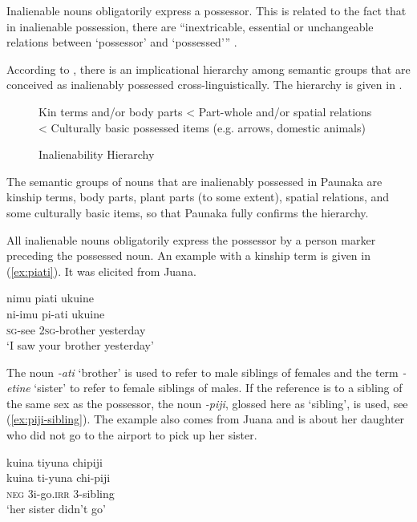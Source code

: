 Inalienable nouns obligatorily express a possessor. This is related to the fact that in inalienable possession, there are “inextricable, essential or unchangeable relations between ‘possessor’ and ‘possessed’” \citep[4]{ChappelMcGregor1996}. 

According to \citet[572]{Nichols1988}, there is an implicational hierarchy among semantic groups that are conceived as inalienably possessed cross-linguistically. The hierarchy is given in .

\begin{figure}[!ht]
\centering
Kin terms and/or body parts < Part-whole and/or spatial relations < Culturally basic possessed items (e.g. arrows, domestic animals)
\caption{Inalienability Hierarchy \citep[572]{Nichols1988}}
\label{fig:InalienabilityHierarchy}
\end{figure}

The semantic groups of nouns that are inalienably possessed in Paunaka are kinship terms, body parts, plant parts (to some extent), spatial relations, and some culturally basic items, so that Paunaka fully confirms the hierarchy.

All inalienable nouns obligatorily express the possessor by a person marker preceding the possessed noun. An example with a kinship term is given in (\ref{ex:piati}). It was elicited from Juana.

\ea\label{ex:piati}
\begingl 
\glpreamble nimu piati ukuine\\
\gla ni-imu pi-ati ukuine\\ 
\textsc{sg}-see 2\textsc{sg}-brother yesterday\\ 
\glft ‘I saw your brother yesterday’
\trailingcitation{[jxx-e110923l-1.049]}
\xe
{}

The noun \textit{-ati} ‘brother’ is used to refer to male siblings of females and the term \textit{-etine} ‘sister’ to refer to female siblings of males. If the reference is to a sibling of the same sex as the possessor, the noun \textit{-piji}, glossed here as ‘sibling’, is used, see (\ref{ex:piji-sibling}). The example also comes from Juana and is about her daughter who did not go to the airport to pick up her sister.

\ea\label{ex:piji-sibling}
\begingl 
\glpreamble kuina tiyuna chipiji\\
\gla kuina ti-yuna chi-piji\\ 
\glb \textsc{neg} 3i-go.\textsc{irr} 3-sibling\\ 
\glft ‘her sister didn’t go’
\trailingcitation{[jxx-p110923l-1.299]}
\xe

